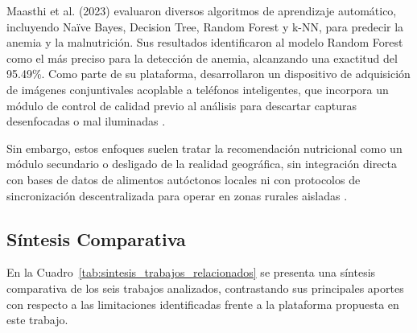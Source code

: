 Maasthi et al. (2023) \cite{maasthi2023} evaluaron diversos algoritmos de aprendizaje automático, incluyendo Naïve Bayes, Decision Tree, Random Forest y k-NN, para predecir la anemia y la malnutrición. Sus resultados identificaron al modelo Random Forest como el más preciso para la detección de anemia, alcanzando una exactitud del 95.49\%. Como parte de su plataforma, desarrollaron un dispositivo de adquisición de imágenes conjuntivales acoplable a teléfonos inteligentes, que incorpora un módulo de control de calidad previo al análisis para descartar capturas desenfocadas o mal iluminadas \cite{maasthi2023}.

Sin embargo, estos enfoques suelen tratar la recomendación nutricional como un módulo secundario o desligado de la realidad geográfica, sin integración directa con bases de datos de alimentos autóctonos locales ni con protocolos de sincronización descentralizada para operar en zonas rurales aisladas \cite{maasthi2023, dimitrievski2021}.

\subsection{Síntesis Comparativa}
En la Cuadro~\ref{tab:sintesis_trabajos_relacionados} se presenta una síntesis comparativa de los seis trabajos analizados, contrastando sus principales aportes con respecto a las limitaciones identificadas frente a la plataforma propuesta en este trabajo.


